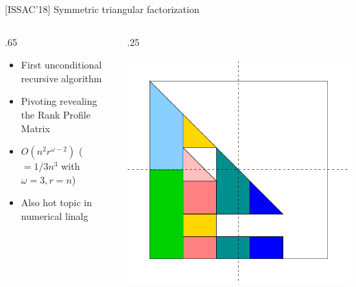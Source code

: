\documentclass{beamer}
\begin{document}
\begin{frame}
  \begin{block}{[ISSAC'18] Symmetric triangular factorization}
    \begin{columns}
      \begin{column} {.65\textwidth}
        \begin{itemize}
        \item First unconditional recursive algorithm
        \item Pivoting revealing the Rank Profile Matrix
        \item $O(n^2r^{\omega-2}) $ ($=1/3n^3$ with $\omega=3, r=n$)
        \item Also hot topic in numerical linalg \\ [LAPACK Working notes 294, Dec'17]
        \end{itemize}
      \end{column}
      \begin{column} {.25\textwidth}
        \begin{center}
          \includegraphics[width=\textwidth]{ARrec11}
        \end{center}
      \end{column}
    \end{columns}
  \end{block}
\end{frame}
\end{document}
